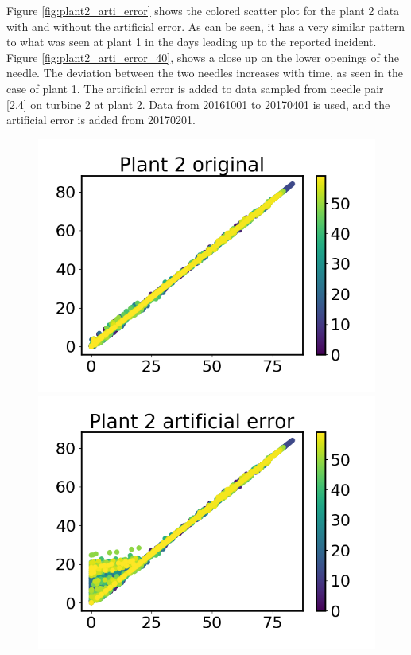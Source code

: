         Figure \ref{fig:plant2_arti_error} shows the colored scatter plot for the plant 2 data with and without the artificial error. As can be seen, it has a very similar pattern to what was seen at plant 1 in the days leading up to the reported incident. Figure \ref{fig:plant2_arti_error_40}, shows a close up on the lower openings of the needle. The deviation between the two needles increases with time, as seen in the case of plant 1. The artificial error is added to data sampled from needle pair [2,4] on turbine 2 at plant 2. Data from 20161001 to 20170401 is used, and the artificial error is added from 20170201.     
        
        \begin{figure}
            \begin{minipage}[b]{0.5\linewidth}
                \centering
                \includegraphics[width = \textwidth]{report/figures/analysis/artificial error/original_data_small.png}
            \end{minipage}
            \begin{minipage}[b]{0.5\linewidth}
                \centering
                \includegraphics[width = \textwidth]{report/figures/analysis/artificial error/plant2_arti_error_small.png}

\end{minipage}
\end{figure}
